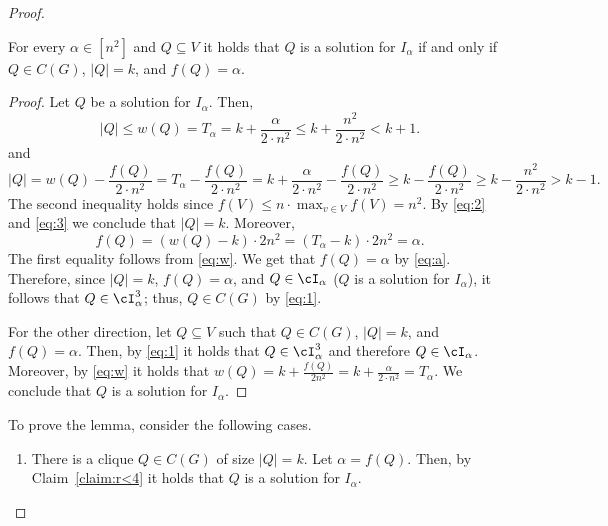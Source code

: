 {\begin{proof}
			\begin{claim}
				\label{claim:r<4}
				For every $\alpha \in [n^2]$ and $Q \subseteq V$ it holds that $Q$ is a solution for $I_{\alpha}$ if and only if $Q \in C(G)$, $|Q| = k$, and $f(Q) = \alpha$. 
			\end{claim}
			
			\begin{proof}
				Let $Q$ be a solution for $I_{\alpha}$. Then, \begin{equation}
					\label{eq:2}
					|Q| \leq w(Q) = T_{\alpha} = k+\frac{\alpha}{2 \cdot n^2} \leq k+\frac{n^2}{2 \cdot n^2} < k+1.  
				\end{equation}
				and 
				\begin{equation}
					\label{eq:3}
					|Q| = w(Q)- \frac{f(Q)}{2 \cdot n^2} = T_{\alpha} - \frac{f(Q)}{2 \cdot n^2}= k+\frac{\alpha}{2 \cdot n^2}- \frac{f(Q)}{2 \cdot n^2} \geq k- \frac{f(Q)}{2 \cdot n^2} \geq k - \frac{n^2}{2 \cdot n^2} > k-1.  
				\end{equation} The second inequality holds since $f(V) \leq n \cdot \max_{v \in V} f(V) = n^2$. By \eqref{eq:2} and \eqref{eq:3} we conclude that $|Q| = k$. Moreover, %
				\begin{equation}
					\label{eq:a}
					f(Q) = (w(Q) - k) \cdot 2 n^2  = (T_{\alpha}-k) \cdot 2 n^2 = \alpha.  
				\end{equation} The first equality follows from \eqref{eq:w}. We get that $f(Q) = \alpha$ by \eqref{eq:a}. Therefore, since $|Q| = k$, $f(Q) = \alpha$, and $Q \in \cI_{\alpha}$ ($Q$ is a solution for $I_{\alpha}$), it follows that  $Q \in \cI^3_{\alpha}$; thus, $Q \in C(G)$ by \eqref{eq:1}. 
				
				For the other direction, let $Q \subseteq V$  such that $Q \in C(G)$, $|Q| = k$, and $f(Q) = \alpha$. Then, by \eqref{eq:1} it holds that $Q \in \cI^3_{\alpha}$ and therefore $Q \in \cI_{\alpha}$. Moreover, by \eqref{eq:w} it holds that $w(Q) = k+\frac{f(Q)}{2n^2} = k+\frac{\alpha}{2 \cdot n^2} = T_{\alpha}$.  We conclude that $Q$ is a solution for $I_{\alpha}$. 
			\end{proof}
			
			
			To prove the lemma, consider the following cases. \begin{enumerate}
				\item There is a clique $Q \in C(G)$ of size $|Q| = k$. Let $\alpha = f(Q)$. Then, by Claim~\ref{claim:r<4} it holds that $Q$ is a solution for $I_{\alpha}$. 
				

\end{enumerate}
\end{proof}}

